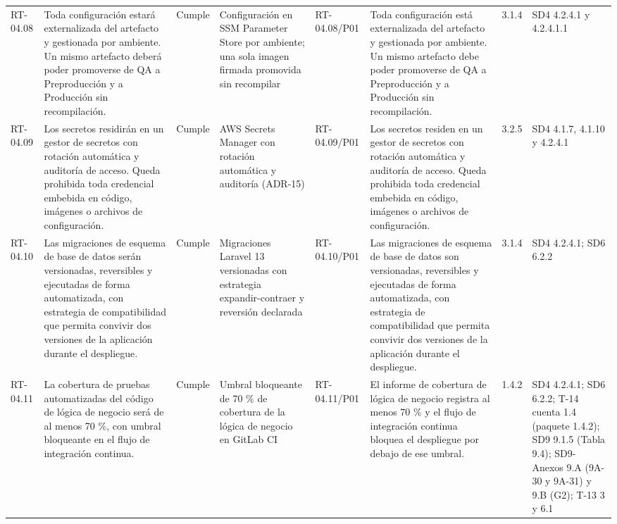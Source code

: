 \documentclass[oficio,firma,final]{lafrox}
\begin{document}
\begin{landscape}
{\begin{longtable}{@{}F{0.054} F{0.173} F{0.061} F{0.191} F{0.106} F{0.180} F{0.067} F{0.168}@{}}
  RT-04.08 & Toda configuración estará externalizada del artefacto y gestionada por ambiente. Un mismo artefacto deberá poder promoverse de QA a Preproducción y a Producción sin recompilación. & Cumple & Configuración en SSM Parameter Store por ambiente; una sola imagen firmada promovida sin recompilar & RT-04.08/\allowbreak{}P01 & Toda configuración está externalizada del artefacto y gestionada por ambiente. Un mismo artefacto debe poder promoverse de QA a Preproducción y a Producción sin recompilación. & 3.1.4 & SD4 4.2.4.1 y 4.2.4.1.1  \\
  RT-04.09 & Los secretos residirán en un gestor de secretos con rotación automática y auditoría de acceso. Queda prohibida toda credencial embebida en código, imágenes o archivos de configuración. & Cumple & AWS Secrets Manager con rotación automática y auditoría (ADR-15) & RT-04.09/\allowbreak{}P01 & Los secretos residen en un gestor de secretos con rotación automática y auditoría de acceso. Queda prohibida toda credencial embebida en código, imágenes o archivos de configuración. & 3.2.5 & SD4 4.1.7, 4.1.10 y 4.2.4.1  \\
  RT-04.10 & Las migraciones de esquema de base de datos serán versionadas, reversibles y ejecutadas de forma automatizada, con estrategia de compatibilidad que permita convivir dos versiones de la aplicación durante el despliegue. & Cumple & Migraciones Laravel 13 versionadas con estrategia expandir-contraer y reversión declarada & RT-04.10/\allowbreak{}P01 & Las migraciones de esquema de base de datos son versionadas, reversibles y ejecutadas de forma automatizada, con estrategia de compatibilidad que permita convivir dos versiones de la aplicación durante el despliegue. & 3.1.4 & SD4 4.2.4.1; SD6 6.2.2  \\
  RT-04.11 & La cobertura de pruebas automatizadas del código de lógica de negocio será de al menos 70 \%, con umbral bloqueante en el flujo de integración continua. & Cumple & Umbral bloqueante de 70 \% de cobertura de la lógica de negocio en GitLab CI & RT-04.11/\allowbreak{}P01 & El informe de cobertura de lógica de negocio registra al menos 70 \% y el flujo de integración continua bloquea el despliegue por debajo de ese umbral. & 1.4.2 & SD4 4.2.4.1; SD6 6.2.2; T-14 cuenta 1.4 (paquete 1.4.2); SD9 9.1.5 (Tabla 9.4); SD9-Anexos 9.A (9A-30 y 9A-31) y 9.B (G2); T-13 3 y 6.1  \\

\end{longtable}}
\end{landscape}
\end{document}
